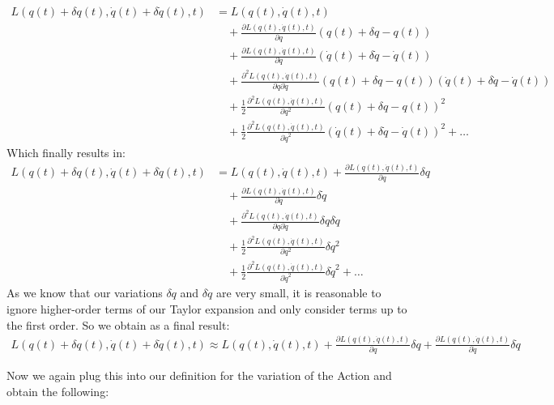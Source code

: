 \documentclass{article}
\begin{document}
	\begin{align*}
		L(q(t)+\delta q(t), \dot{q}(t)+\delta \dot{q}(t), t) &= L(q(t),\dot{q}(t),t) \\
		&\quad + \frac{\partial L(q(t),\dot{q}(t), t)}{\partial q}(q(t)+\delta q-q(t)) \\
		&\quad + \frac{\partial L(q(t),\dot{q}(t), t)}{\partial \dot{q}}(\dot{q}(t)+\delta \dot{q}-\dot{q}(t)) \\
		&\quad + \frac{\partial^2 L(q(t),\dot{q}(t), t)}{\partial q \partial \dot{q}}(q(t)+\delta q-q(t))(\dot{q}(t)+\delta \dot{q}-\dot{q}(t)) \\
		&\quad + \frac{1}{2}\frac{\partial^2 L(q(t),\dot{q}(t), t)}{\partial q^2}(q(t)+\delta q-q(t))^2 \\
		&\quad + \frac{1}{2}\frac{\partial^2 L(q(t),\dot{q}(t), t)}{\partial \dot{q}^2}(\dot{q}(t)+\delta \dot{q}-\dot{q}(t))^2+\dots
	\end{align*}
	Which finally results in:
	\begin{align*}
		L(q(t)+\delta q(t), \dot{q}(t)+\delta \dot{q}(t), t) &= L(q(t),\dot{q}(t),t) + \frac{\partial L(q(t),\dot{q}(t), t)}{\partial q}\delta q \\
		&\quad + \frac{\partial L(q(t),\dot{q}(t), t)}{\partial \dot{q}}\delta \dot{q} \\
		&\quad + \frac{\partial^2 L(q(t),\dot{q}(t), t)}{\partial q \partial \dot{q}}\delta q\delta \dot{q} \\
		&\quad + \frac{1}{2}\frac{\partial^2 L(q(t),\dot{q}(t), t)}{\partial q^2}\delta q^2 \\
		&\quad + \frac{1}{2}\frac{\partial^2 L(q(t),\dot{q}(t), t)}{\partial \dot{q}^2}\delta \dot{q}^2+\dots
	\end{align*}
	As we know that our variations $\delta q$ and $\delta \dot{q}$ are very small, it is reasonable to ignore higher-order terms of our Taylor expansion and only consider terms up to the first order.
	So we obtain as a final result:
	\begin{align*}
		L(q(t)+\delta q(t), \dot{q}(t)+\delta \dot{q}(t), t) \approx L(q(t),\dot{q}(t),t) + \frac{\partial L(q(t),\dot{q}(t), t)}{\partial q}\delta q + \frac{\partial L(q(t),\dot{q}(t), t)}{\partial \dot{q}}\delta \dot{q}
	\end{align*}
	
	Now we again plug this into our definition for the variation of the Action and obtain the following:
	
\end{document}

